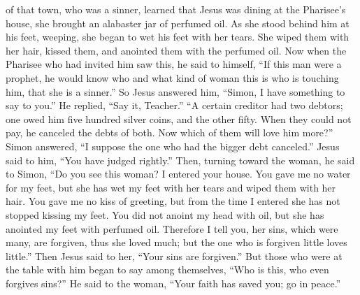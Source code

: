 {of that town,
who
was
a sinner,
learned
that
Jesus was dining
at
the Pharisee’s
house,
she brought
an alabaster jar
of perfumed oil.
As she stood
behind
him at
his
feet,
weeping,
she began
to wet
his
feet
with her tears.
She wiped
them with her hair,
kissed
them,
and
anointed
them with the perfumed oil.
Now when the Pharisee
who had invited
him
saw
this, he said
to
himself,
“If
this man
were
a prophet,
he would know
who
and
what kind of
woman
this is who
is touching
him,
that
she is
a sinner.”
So
Jesus
answered
him, “Simon,
I have
something to say
to you.”
He replied, “Say
it, Teacher.”
“A certain
creditor
had two
debtors;
one
owed
him five hundred
silver coins,
and
the other
fifty.
When they could
not
pay,
he canceled the debts
of both.
Now
which of them
will love
him
more?”
Simon
answered, “I suppose
the one who had
the bigger
debt canceled.”
Jesus said
to him,
“You have judged
rightly.”
Then,
turning
toward
the woman,
he said
to Simon,
“Do you see
this
woman? I entered
your
house.
You gave
me
no
water
for
my feet,
but
she has wet
my
feet
with her tears
and
wiped
them
with her hair.
You gave
me
no
kiss
of greeting, but
from
the time I entered
she has
not
stopped
kissing
my
feet.
You did
not
anoint
my
head
with oil,
but
she has anointed
my
feet
with perfumed oil.
Therefore I tell
you,
her
sins,
which were many,
are forgiven,
thus she loved
much;
but
the one who
is forgiven
little
loves
little.”
Then Jesus said
to her,
“Your
sins
are forgiven.”
But
those who were at the table
with him began
to say
among
themselves,
“Who
is
this,
who
even
forgives
sins?”
He said
to
the woman,
“Your
faith
has saved
you;
go
in
peace.”

}
